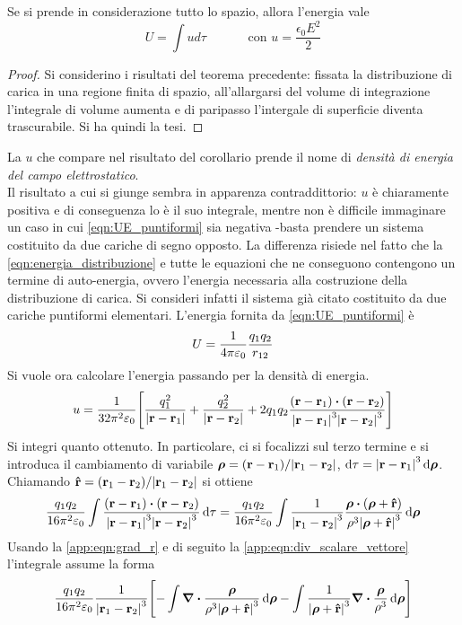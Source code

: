 \begin{cor}
    Se si prende in considerazione tutto lo spazio, allora l'energia vale
    \[
        U=\int ud\tau \quad\quad\quad \text{ con } u=\frac{\epsilon_0 E^2}{2}
    \]
\end{cor}
\begin{proof}
    Si considerino i risultati del teorema precedente: fissata la distribuzione di carica in una regione finita di spazio,
    all'allargarsi del volume di integrazione l'integrale di volume aumenta e di paripasso l'intergale di superficie
    diventa trascurabile. Si ha quindi la tesi.
\end{proof}
La $u$ che compare nel risultato del corollario prende il nome di \textit{densità di energia del campo elettrostatico}.\\
Il risultato a cui si giunge sembra in apparenza contraddittorio: $u$ è chiaramente positiva e di conseguenza lo è il
suo integrale, mentre non è difficile immaginare un caso in cui \eqref{eqn:UE_puntiformi} sia negativa -basta
prendere un sistema costituito da due cariche di segno opposto. La differenza risiede nel fatto che la
\eqref{eqn:energia_distribuzione} e tutte le equazioni che ne conseguono contengono un termine di auto-energia,
ovvero l'energia necessaria alla costruzione della distribuzione di carica. Si consideri infatti
il sistema già citato costituito da due cariche puntiformi elementari. L'energia fornita da \eqref{eqn:UE_puntiformi}
è
\[
    U=\frac{1}{4\pi\varepsilon_0} \frac{q_1 q_2}{r_{12}}
\]
Si vuole ora calcolare l'energia passando per la densità di energia.
\[
    u=\rec{32\pi^2\epsilon_0}\Biggl[\frac{q_1^2}{\abs{\vb{r}-\vb{r}_1}} + \frac{q_2^2}{\abs{\vb{r}-\vb{r}_2}}+
    2q_1 q_2 \frac{(\vb{r}-\vb{r}_1)\vdot(\vb{r}-\vb{r}_2)}{\abs{\vb{r}-\vb{r}_1}^3\abs{\vb{r}-\vb{r}_2}^3} \Biggr]
\]
Si integri quanto ottenuto. In particolare, ci si focalizzi sul terzo termine e si introduca il cambiamento di variabile
$\vb*{\rho}=(\vb{r}-\vb{r}_1)/\abs{\vb{r}_1-\vb{r}_2}$, $\dd{\vb{\tau}}=\abs{\vb{r}-\vb{r}_1}^3\dd{\vb*{\rho}}$. Chiamando
$\vu{r}=(\vb{r}_1-\vb{r}_2)/\abs{\vb{r}_1-\vb{r}_2}$ si ottiene
\[
    \frac{ q_1 q_2}{16\pi^2\epsilon_0}
    \int\frac{(\vb{r}-\vb{r}_1)\vdot(\vb{r}-\vb{r}_2)}{\abs{\vb{r}-\vb{r}_1}^3\abs{\vb{r}-\vb{r}_2}^3}\dd{\tau}=
    \frac{ q_1 q_2}{16\pi^2\epsilon_0}
    \int\rec{\abs{\vb{r}_1-\vb{r}_2}^3}\frac{\vb*{\rho}\vdot(\vb*{\rho}+\vu{r})}{\rho^3\abs{\vb*{\rho}+\vu{r}}^3}\dd{\vb*{\rho}}
\]
Usando la \eqref{app:eqn:grad_r} e di seguito la \eqref{app:eqn:div_scalare_vettore} l'integrale assume la forma
\[
    \frac{ q_1 q_2}{16\pi^2\varepsilon_0}\frac{1}{\abs{\vb{r}_1-\vb{r}_2}^3}
    \Biggl[-\int\div{\frac{\vb*{\rho}}{\rho^3\abs{\vb*{\rho}+\vu{r}}^3}\dd{\vb*{\rho}}}
    -\int\frac{1}{\abs{\vb*{\rho}+\vu{r}}^3}{\div{\frac{\vb*{\rho}}{\rho^3}}\dd{\vb*{\rho}}}\Biggr]
\]

